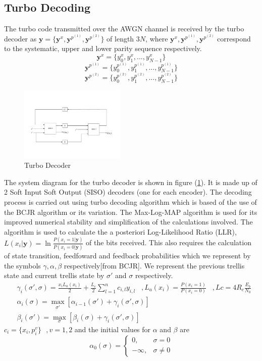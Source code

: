 \documentclass[twocolumn]{article}
\begin{document}
 \subsection{Turbo Decoding}
 The turbo code transmitted over the AWGN channel is received by the turbo decoder as
  $\mathbf{y}=\{\mathbf{y}^x,\mathbf{y}^{p^{(1)}},\mathbf{y}^{p^{(2)}}\}$ 
  of length $3N$, where $\mathbf{y}^x,\mathbf{y}^{p^{(1)}},\mathbf{y}^{p^{(2)}}$
    correspond to the systematic, upper and lower parity sequence respectively.
    $$\mathbf{y}^x=\{y^x_0, y^x_1,...,y^x_{N-1}\}$$ 
    $$\mathbf{y}^{p^{(1)}}=\{y^{p^{(1)}}_0, y^{p^{(1)}}_1,...,y^{p^{(1)}}_{N-1} \}$$
 $$\mathbf{y}^{p^{(2)}}=\{y^{p^{(2)}}_0, y^{p^{(2)}}_1,...,y^{p^{(2)}}_{N-1}\}$$
\begin{figure}[h!]
\centering
		\includegraphics[width=0.45\textwidth]{D1.pdf}
		\caption{Turbo Decoder}
		\label{TDC}
		\end{figure}
	
 
 The system diagram for the turbo decoder is shown in figure (\ref{TDC}). It is made up of 2
 Soft Input Soft Output (SISO) decoders (one for each encoder). The decoding 
 process is carried out using turbo decoding algorithm which is based of the use of
 the BCJR algorithm or its variation.  The Max-Log-MAP algorithm is used 
 for its improved numerical stability and simplification of the calculations involved. 
 The algorithm is used to calculate the a posteriori Log-Likelihood Ratio (LLR),  
 $L(x_i|\mathbf{y})=\ln \frac{P(x_i=1|\mathbf{y})}{P(x_i=0|\mathbf{y})}$ 
 of the bits received. This also requires
 the calculation of state transition, feedfoward and feedback probabilities which we
 represent by the symbols $\gamma,\alpha, \beta $ respectively[from BCJR]. We 
 represent the previous trellis state and current trellis state by $\sigma'$ and $\sigma$ 
 respectively.
\begin{equation}
\begin{split}
&\gamma_i(\sigma',\sigma)=
\frac{x_i L_a (x_i)}{2}+
\frac{L_c}{2}\sum_{l=1}^{n} c_{i,l}y_{i,l}\,\,\,\,\, ,L_a(x_i) =\frac{P(x_i=1)}{P(x_i=0)}
\,\,\,\,\, ,Lc=4R_c\frac{E_b}{N_0}\\
&\alpha_i(\sigma)=\max_{\sigma'}[\alpha_{i-1}(\sigma')+\gamma_i(\sigma',\sigma)]\\
&\beta_i(\sigma')=\max_{\sigma}[\beta_{i}(\sigma)+\gamma_i(\sigma',\sigma)]
\end{split}
\label{abc}
\end{equation}
$c_i=\{x_i,p^{v}_i\}\,\,\,\, ,v=1,2$ and the initial values for $\alpha$ and $\beta$ are
\[
    \alpha_0(\sigma)= 
\begin{cases}
   0,& \sigma= 0\\        -\infty,              &  \sigma \neq 0
\end{cases}
\]
\end{document}
